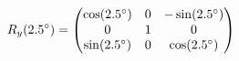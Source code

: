 \documentclass[preview]{standalone}
\begin{document}
\begin{align*}
\special{dvisvgm:raw <g id='unique000'>}R_y(2.5^\circ) = \begin{pmatrix} \cos(2.5^\circ) & 0 & -\sin(2.5^\circ) \\ 0 & 1 & 0 \\ \sin(2.5^\circ) & 0 & \cos(2.5^\circ) \end{pmatrix}\special{dvisvgm:raw </g>}
\end{align*}
\end{document}
